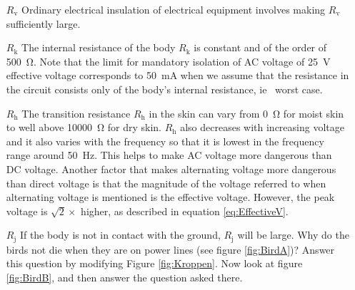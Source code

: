 \documentclass[../Elmag-labhefte-2020.tex]{subfiles}
\begin{document}
\begin{itemize}
    \item [$R_\text{v}$] Ordinary electrical insulation of electrical equipment involves making $R_\text{v}$ sufficiently large.
    
    
    \item [$R_\text{k}$] The internal resistance of the body $R_\text{k}$ is constant and of the order of \SI{500}{\ohm}. Note that the limit for mandatory isolation of AC voltage of \SI{25}{\V} effective voltage corresponds to \SI{50}{\milli\ampere} when we assume that the resistance in the circuit consists only of the body's internal resistance, ie \ worst case.
    \item [$R_\text{h}$] The transition resistance $R_\text{h}$ in the skin can vary from \SI{0}{\ohm} for moist skin to well above \SI{10000}{\ohm} for dry skin. $R_\text{h}$ also decreases with increasing voltage and it also varies with the frequency so that it is lowest in the frequency range around \SI{50}{\hertz}. This helps to make AC voltage more dangerous than DC voltage. Another factor that makes alternating voltage more dangerous than direct voltage is that the magnitude of the voltage referred to when alternating voltage is mentioned is the effective voltage. However, the peak voltage is $\sqrt{2} \times $ higher, as described in equation \eqref{eq:EffectiveV}.
    \item [$R_\text{j}$] If the body is not in contact with the ground, $R_\text{j}$ will be large. Why do the birds not die when they are on power lines (see figure \ref{fig:BirdA})? Answer this question by modifying Figure \ref{fig:Kroppen}. Now look at figure \ref{fig:BirdB}, and then answer the question asked there.
\end{itemize}
\end{document}
